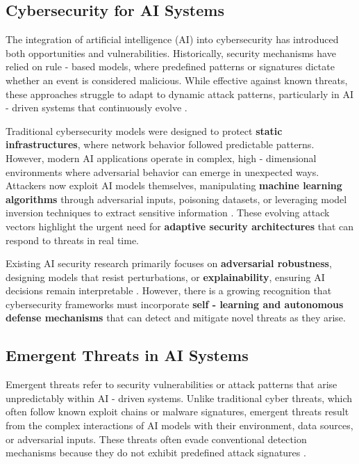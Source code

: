 \documentclass{article}
\begin{document}
\subsection{Cybersecurity for AI Systems}
The integration of artificial intelligence (AI) into cybersecurity has introduced both opportunities and vulnerabilities. Historically, security mechanisms have relied on rule - based models, where predefined patterns or signatures dictate whether an event is considered malicious. While effective against known threats, these approaches struggle to adapt to dynamic attack patterns, particularly in AI - driven systems that continuously evolve \cite{tramer2017ensemble}.

Traditional cybersecurity models were designed to protect \textbf{static infrastructures}, where network behavior followed predictable patterns. However, modern AI applications operate in complex, high - dimensional environments where adversarial behavior can emerge in unexpected ways. Attackers now exploit AI models themselves, manipulating \textbf{machine learning algorithms} through adversarial inputs, poisoning datasets, or leveraging model inversion techniques to extract sensitive information \cite{sharif2016accessorize}. These evolving attack vectors highlight the urgent need for \textbf{adaptive security architectures} that can respond to threats in real time.

Existing AI security research primarily focuses on \textbf{adversarial robustness}, designing models that resist perturbations, or \textbf{explainability}, ensuring AI decisions remain interpretable \cite{goodfellow2014explaining, papernot2016limitations}. However, there is a growing recognition that cybersecurity frameworks must incorporate \textbf{self - learning and autonomous defense mechanisms} that can detect and mitigate novel threats as they arise.

\subsection{Emergent Threats in AI Systems}
Emergent threats refer to security vulnerabilities or attack patterns that arise unpredictably within AI - driven systems. Unlike traditional cyber threats, which often follow known exploit chains or malware signatures, emergent threats result from the complex interactions of AI models with their environment, data sources, or adversarial inputs. These threats often evade conventional detection mechanisms because they do not exhibit predefined attack signatures \cite{biggio2013evasion}.
\end{document}
